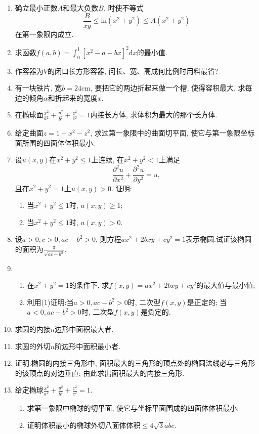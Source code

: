 \begin{enumerate}
\item 确立最小正数$A$和最大负数$B$, 时使不等式$$
\frac{B}{xy}\le \mathrm{ln}(x^2+y^2)\le A(x^2+y^2)$$
在第一象限内成立.
\item 求函数$f(a,b)=\displaystyle{\int_{0}^{1}[x^2-a-bx]^2}\mathrm{d}x$的最小值.
\item 作容器为$V$的闭口长方形容器, 问长、宽、高成何比例时用料最省?
\item 有一块铁片, 宽$b=24$cm, 要把它的两边折起来做一个槽, 使得容积最大, 求每边的倾角$\alpha$和折起来的宽度$x$.
\item 在椭球面$\frac{x^2}{a^2}+\frac{y^2}{b^2}+\frac{z^2}{c^2}=1$内接长方体, 求体积为最大的那个长方体.
\item 给定曲面$z=1-x^2-z^2$, 求过第一象限中的曲面切平面, 使它与第一象限坐标面所围的四面体体积最小.
\item 设$u(x,y)$在$x^2+y^2\le 1$上连续, 在$x^2+y^2<1$上满足$$
\frac{\partial^2 u}{\partial x^2} +\frac{\partial^2 u}{\partial y^2}=u,$$
且在$x^2+y^2=1$上$u(x,y)>0$. 证明:
\begin{enumerate}
	\item 当$x^2+y^2\le 1$时, $u(x,y)\ge 1$;
	\item 当$x^2+y^2\le 1$时, $u(x,y)> 0$.
\end{enumerate}
\item 设$a>0,c>0,ac-b^2>0$, 则方程$ax^2+2bxy+cy^2=1$表示椭圆.试证该椭圆的面积为$\frac{\pi}{\sqrt{ac-b^2}}$.
\item 
\begin{enumerate}
	\item 在$x^2+y^2=1$的条件下, 求$f(x,y)=ax^2+2bxy+cy^2$的最大值与最小值;
	\item 利用(1)证明:当$a>0,ac-b^2>0$时, 二次型$f(x,y)$是正定的; 当$a<0,ac-b^2>0$时, 二次型$f(x,y)$是负定的.
\end{enumerate}
\item 求圆的内接$n$边形中面积最大者.
\item 求圆的外切$n$阶边形中面积最小者.
\item 证明:椭圆的内接三角形中, 面积最大的三角形的顶点处的椭圆法线必与三角形的该顶点的对边垂直; 由此求出面积最大的内接三角形.
\item 给定椭球$\frac{x^2}{a^2}+\frac{y^2}{b^2}+\frac{z^2}{c^2}=1$.
\begin{enumerate}
	\item 求第一象限中椭球的切平面, 使它与坐标平面围成的四面体体积最小;
	\item 证明体积最小的椭球外切八面体体积$\le 4\sqrt{3}abc$.
\end{enumerate}

\end{enumerate}
